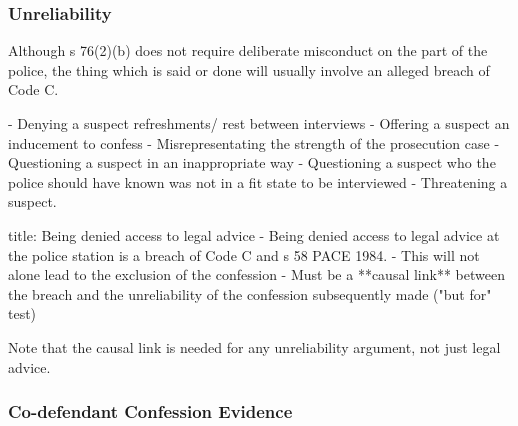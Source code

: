 \documentclass[
]{article}
\newenvironment{Shaded}{}{}
\newcommand{\NormalTok}[1]{#1}
\begin{document}
\hypertarget{unreliability}{%
\subsubsection{Unreliability}\label{unreliability}}

Although s 76(2)(b) does not require deliberate misconduct on the part
of the police, the thing which is said or done will usually involve an
alleged breach of Code C.

\begin{Shaded}
\begin{Highlighting}[]
\NormalTok{{-} Denying a suspect refreshments/ rest between interviews}
\NormalTok{{-} Offering a suspect an inducement to confess}
\NormalTok{{-} Misrepresentating the strength of the prosecution case}
\NormalTok{{-} Questioning a suspect in an inappropriate way}
\NormalTok{{-} Questioning a suspect who the police should have known was not in a fit state to be interviewed}
\NormalTok{{-} Threatening a suspect.}
\end{Highlighting}
\end{Shaded}

\begin{Shaded}
\begin{Highlighting}[]
\NormalTok{title: Being denied access to legal advice}
\NormalTok{{-} Being denied access to legal advice at the police station is a breach of Code C and s 58 PACE 1984. }
\NormalTok{{-} This will not alone lead to the exclusion of the confession}
\NormalTok{{-} Must be a **causal link** between the breach and the unreliability of the confession subsequently made ("but for" test)}
\end{Highlighting}
\end{Shaded}

Note that the causal link is needed for any unreliability argument, not
just legal advice.

\hypertarget{co-defendant-confession-evidence}{%
\subsubsection{Co-defendant Confession
Evidence}\label{co-defendant-confession-evidence}}
\end{document}
